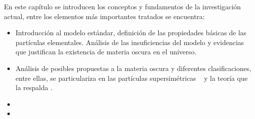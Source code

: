 En este capítulo se introducen los conceptos y fundamentos de la investigación actual, entre los elementos más importantes tratados se encuentra:
\begin{itemize}
\item Introducción al modelo estándar, definición de las propiedades básicas de las partículas elementales. Análisis de las insuficiencias del modelo y evidencias que justifican la existencia de materia oscura en el universo.
\item Análisis de posibles propuestas a la materia oscura y diferentes clasificaciones, entre ellas, se particulariza en las partículas supersimétricas \SUSY ~  y la teoría que la respalda \MSSM.
\item 
\item 
\end{itemize}